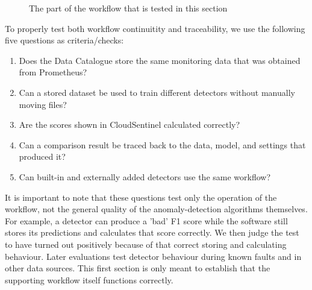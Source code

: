\begin{figure}[H]
    \centering
    \caption{The part of the workflow that is tested in this section}
    \label{fig:h9-functional-evaluation-path}
\end{figure}

To properly test both workflow continuitity and traceability, we use the following five questions as criteria/checks:

\begin{enumerate}
    \item Does the Data Catalogue store the same monitoring data that was obtained from Prometheus?
    \item Can a stored dataset be used to train different detectors without manually moving files?
    \item Are the scores shown in CloudSentinel calculated correctly?
    \item Can a comparison result be traced back to the data, model, and settings that produced it?
    \item Can built-in and externally added detectors use the same workflow?
\end{enumerate}

It is important to note that these questions test only the operation of the workflow, not the general quality of the anomaly-detection algorithms themselves. For example, a detector can produce a 'bad' F1 score while the software still stores its predictions and calculates that score correctly. We then judge the test to have turned out positively because of that correct storing and calculating behaviour. Later evaluations test detector behaviour during known faults and in other data sources. This first section is only meant to establish that the supporting workflow itself functions correctly.

